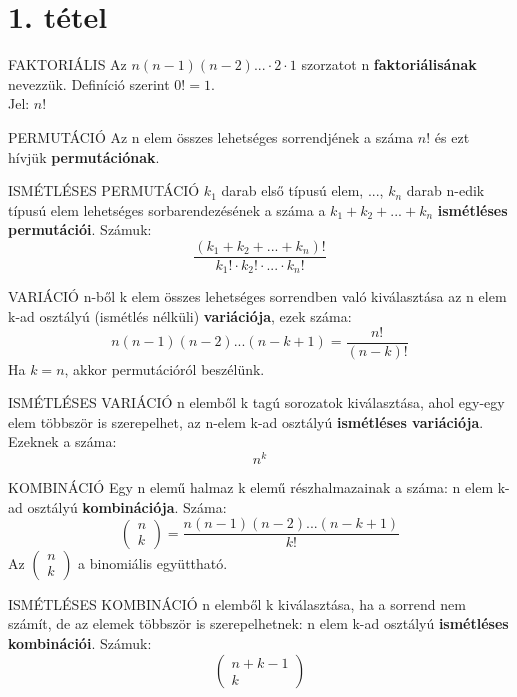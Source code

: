 \section{1. tétel}

\begin{definicio}{FAKTORIÁLIS}
Az $n(n-1)(n-2)...\cdot2\cdot1$ szorzatot n \textbf{faktoriálisának} nevezzük. Definíció szerint $0! = 1$.\\
Jel: $n!$
\end{definicio}

\begin{definicio}{PERMUTÁCIÓ}
Az n elem összes lehetséges sorrendjének a száma $n!$ és ezt hívjük \textbf{permutációnak}.
\end{definicio}

\begin{definicio}{ISMÉTLÉSES PERMUTÁCIÓ}
$k_1$ darab első típusú elem, ..., $k_n$ darab n-edik típusú elem lehetséges sorbarendezésének a száma a $k_1 + k_2 + ... + k_n$ \textbf{ismétléses permutációi}. Számuk:
$$\frac{(k_1+k_2+...+k_n)!}{k_1!\cdot k_2!\cdot...\cdot k_n!}$$
\end{definicio}

\begin{definicio}{VARIÁCIÓ}
n-ből k elem összes lehetséges sorrendben való kiválasztása az n elem k-ad osztályú (ismétlés nélküli) \textbf{variációja}, ezek száma:
$$n(n-1)(n-2)...(n-k+1) = \frac{n!}{(n-k)!}$$
Ha $k=n$, akkor permutációról beszélünk.
\end{definicio}

\begin{definicio}{ISMÉTLÉSES VARIÁCIÓ}
n elemből k tagú sorozatok kiválasztása, ahol egy-egy elem többször is szerepelhet, az n-elem k-ad osztályú \textbf{ismétléses variációja}. Ezeknek a száma:
$$n^k$$
\end{definicio}

\begin{definicio}{KOMBINÁCIÓ}
Egy n elemű halmaz k elemű részhalmazainak a száma: n elem k-ad osztályú \textbf{kombinációja}. Száma:
$$\begin{pmatrix}
n\\k
\end{pmatrix} = \frac{n(n-1)(n-2)...(n-k+1)}{k!}$$
Az $\begin{pmatrix}
n\\k
\end{pmatrix}$ a binomiális együttható.
\end{definicio}

\begin{definicio}{ISMÉTLÉSES KOMBINÁCIÓ}
n elemből k kiválasztása, ha a sorrend nem számít, de az elemek többször is szerepelhetnek: n elem k-ad osztályú \textbf{ismétléses kombinációi}. Számuk: $$\begin{pmatrix}
n+k-1\\k
\end{pmatrix}$$
\end{definicio}

